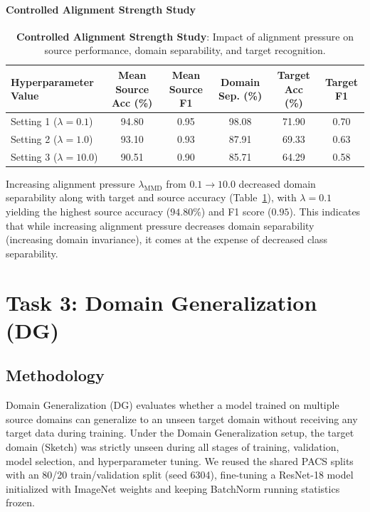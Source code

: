 \documentclass{article}
\begin{document}
\paragraph{Controlled Alignment Strength Study}
\begin{table}[H]
    \centering
    \caption{\textbf{Controlled Alignment Strength Study}: Impact of alignment pressure on source performance, domain separability, and target recognition.}
    \label{tab:task2_design_study}
    \begin{tabular}{lccccc}
        \toprule
        \textbf{Hyperparameter Value} & \textbf{Mean Source Acc (\%)} & \textbf{Mean Source F1} & \textbf{Domain Sep. (\%)} & \textbf{Target Acc (\%)} & \textbf{Target F1} \\
        \midrule
        Setting 1 ($\lambda=0.1$) & 94.80 & 0.95 & 98.08 & 71.90 & 0.70 \\
        Setting 2 ($\lambda=1.0$) & 93.10 & 0.93 & 87.91 & 69.33 & 0.63 \\
        Setting 3 ($\lambda=10.0$) & 90.51 & 0.90 & 85.71 & 64.29 & 0.58 \\
        \bottomrule
    \end{tabular}
\end{table}
Increasing alignment pressure $\lambda_{\text{MMD}}$ from $0.1 \rightarrow 10.0$ decreased domain separability along with target and source accuracy (Table~\ref{tab:task2_design_study}), with $\lambda=0.1$ yielding the highest source accuracy ($94.80\%$) and F1 score ($0.95$). This indicates that while increasing alignment pressure decreases domain separability (increasing domain invariance), it comes at the expense of decreased class separability.


\newpage
\section{Task 3: Domain Generalization (DG)}
\label{sec:task3}

\subsection{Methodology}
Domain Generalization (DG) evaluates whether a model trained on multiple source domains can generalize to an unseen target domain without receiving any target data during training. Under the Domain Generalization setup, the target domain (Sketch) was strictly unseen during all stages of training, validation, model selection, and hyperparameter tuning. We reused the shared PACS splits with an 80/20 train/validation split (seed 6304), fine-tuning a ResNet-18 model initialized with ImageNet weights and keeping BatchNorm running statistics frozen.
\end{document}
